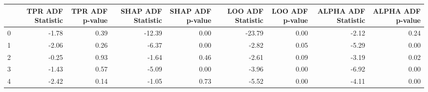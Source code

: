\begin{tabular}{lrrrrrrrr}
\toprule
 & TPR ADF Statistic & TPR ADF p-value & SHAP ADF Statistic & SHAP ADF p-value & LOO ADF Statistic & LOO ADF p-value & ALPHA ADF Statistic & ALPHA ADF p-value \\
\midrule
0 & -1.78 & 0.39 & -12.39 & 0.00 & -23.79 & 0.00 & -2.12 & 0.24 \\
1 & -2.06 & 0.26 & -6.37 & 0.00 & -2.82 & 0.05 & -5.29 & 0.00 \\
2 & -0.25 & 0.93 & -1.64 & 0.46 & -2.61 & 0.09 & -3.19 & 0.02 \\
3 & -1.43 & 0.57 & -5.09 & 0.00 & -3.96 & 0.00 & -6.92 & 0.00 \\
4 & -2.42 & 0.14 & -1.05 & 0.73 & -5.52 & 0.00 & -4.11 & 0.00 \\
\bottomrule
\end{tabular}
